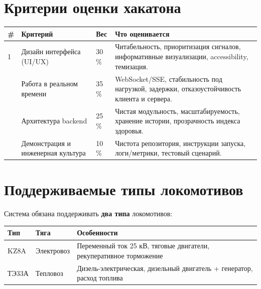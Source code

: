 \documentclass[12pt,a4paper]{article}
\begin{document}
\section{Критерии оценки хакатона}
\label{sec:criteria}

\begin{tabularx}{\textwidth}{C{0.6cm} L{3.8cm} C{1.2cm} X}
\toprule
\textbf{\#} & \textbf{Критерий} & \textbf{Вес} & \textbf{Что оценивается} \\
 & Дизайн интерфейса (UI/UX) & 30\,\% & Читабельность, приоритизация сигналов, информативные визуализации, accessibility, темизация. \\
 & Работа в реальном времени & 35\,\% & WebSocket/SSE, стабильность под нагрузкой, задержки, отказоустойчивость клиента и сервера. \\
 & Архитектура backend & 25\,\% & Чистая модульность, масштабируемость, хранение истории, прозрачность индекса здоровья. \\
 & Демонстрация и инженерная культура & 10\,\% & Чистота репозитория, инструкции запуска, логи/метрики, тестовый сценарий. \\
\bottomrule
\end{tabularx}


\section{Поддерживаемые типы локомотивов}

Система обязана поддерживать \textbf{два типа} локомотивов:

\begin{tabularx}{\textwidth}{l l X}
\toprule
\textbf{Тип} & \textbf{Тяга} & \textbf{Особенности} \\
\midrule
KZ8A & Электровоз & Переменный ток 25 кВ, тяговые двигатели, рекуперативное торможение \\
ТЭ33А & Тепловоз & Дизель-электрическая, дизельный двигатель + генератор, расход топлива \\
\bottomrule
\end{tabularx}
\end{document}
